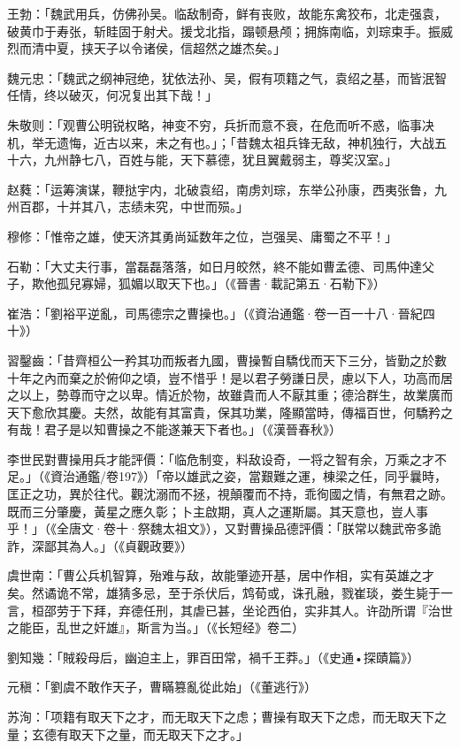 王勃：「魏武用兵，仿佛孙吴。临敌制奇，鲜有丧败，故能东禽狡布，北走强袁，破黄巾于寿张，斩眭固于射犬。援戈北指，蹋顿悬颅；拥旆南临，刘琮束手。振威烈而清中夏，挟天子以令诸侯，信超然之雄杰矣。」

魏元忠：「魏武之纲神冠绝，犹依法孙、吴，假有项籍之气，袁绍之基，而皆泯智任情，终以破灭，何况复出其下哉！」

朱敬则：「观曹公明锐权略，神变不穷，兵折而意不衰，在危而听不惑，临事决机，举无遗悔，近古以来，未之有也。」；「昔魏太祖兵锋无敌，神机独行，大战五十六，九州静七八，百姓与能，天下慕德，犹且翼戴弱主，尊奖汉室。」

赵蕤：「运筹演谋，鞭挞宇内，北破袁绍，南虏刘琮，东举公孙康，西夷张鲁，九州百郡，十并其八，志绩未究，中世而殒。」

穆修：「惟帝之雄，使天济其勇尚延数年之位，岂强吴、庸蜀之不平！」

石勒：「大丈夫行事，當磊磊落落，如日月皎然，終不能如曹孟德、司馬仲達父子，欺他孤兒寡婦，狐媚以取天下也。」（《晉書·載記第五·石勒下》）

崔浩：「劉裕平逆亂，司馬德宗之曹操也。」（《資治通鑑·卷一百一十八·晉紀四十》）

習鑿齒：「昔齊桓公一矜其功而叛者九國，曹操暫自驕伐而天下三分，皆勤之於數十年之內而棄之於俯仰之頃，豈不惜乎！是以君子勞謙日昃，慮以下人，功高而居之以上，勢尊而守之以卑。情近於物，故雖貴而人不厭其重；德洽群生，故業廣而天下愈欣其慶。夫然，故能有其富貴，保其功業，隆顯當時，傳福百世，何驕矜之有哉！君子是以知曹操之不能遂兼天下者也。」（《漢晉春秋》）

李世民對曹操用兵才能評價：「临危制变，料敌设奇，一将之智有余，万乘之才不足。」（《資治通鑑/卷197》）「帝以雄武之姿，當艱難之運，棟梁之任，同乎曩時，匡正之功，異於往代。觀沈溺而不拯，視顛覆而不持，乖徇國之情，有無君之跡。既而三分肇慶，黃星之應久彰；卜主啟期，真人之運斯屬。其天意也，豈人事乎！」（《全唐文·卷十·祭魏太祖文》），又對曹操品德評價：「朕常以魏武帝多詭詐，深鄙其為人。」（《貞觀政要》）

虞世南：「曹公兵机智算，殆难与敌，故能肇迹开基，居中作相，实有英雄之才矣。然谲诡不常，雄猜多忌，至于杀伏后，鸩荀或，诛孔融，戮崔琰，娄生毙于一言，桓邵劳于下拜，弃德任刑，其虐已甚，坐论西伯，实非其人。许劭所谓『治世之能臣，乱世之奸雄』，斯言为当。」（《长短经》卷二）

劉知幾：「賊殺母后，幽迫主上，罪百田常，禍千王莽。」（《史通•探賾篇》）

元稹：「劉虞不敢作天子，曹瞞篡亂從此始」（《董逃行》）

苏洵：「项籍有取天下之才，而无取天下之虑；曹操有取天下之虑，而无取天下之量；玄德有取天下之量，而无取天下之才。」

